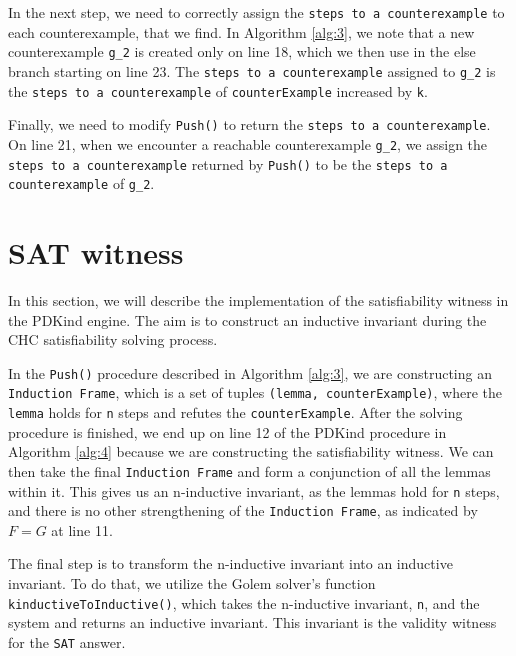 In the next step, we need to correctly assign the \texttt{steps to a
counterexample} to each counterexample, that we find. In Algorithm
\ref{alg:3}, we note that a new counterexample
\texttt{g\_2} is created only on line 18, which we then use in the else branch
starting on line 23. The \texttt{steps to a counterexample} assigned to
\texttt{g\_2} is the \texttt{steps to a counterexample} of
\texttt{counterExample} increased by \texttt{k}.

Finally, we need to modify \texttt{Push()} to return the \texttt{steps to a
counterexample}. On line 21, when we encounter a reachable counterexample
\texttt{g\_2}, we assign the \texttt{steps to a counterexample} returned by
\texttt{Push()} to be the \texttt{steps to a counterexample} of \texttt{g\_2}.

\section*{SAT witness}
\noindent In this section, we will describe the implementation of the
satisfiability witness in the PDKind engine. The aim is to construct an
inductive invariant during the CHC satisfiability solving process.

In the \texttt{Push()} procedure described in Algorithm
\ref{alg:3}, we are constructing an \texttt{Induction
Frame}, which is a set of tuples \texttt{(lemma, counterExample)}, where the
\texttt{lemma} holds for \texttt{n} steps and refutes the
\texttt{counterExample}. After the solving procedure is finished, we end up on
line 12 of the PDKind procedure in Algorithm \ref{alg:4}
because we are constructing the satisfiability
witness. We can then take the final \texttt{Induction Frame} and form a
conjunction of all the lemmas within it. This gives us an n-inductive
invariant, as the lemmas hold for \texttt{n} steps, and there is no other
strengthening of the \texttt{Induction Frame}, as indicated by \( F = G \) at
line 11.

The final step is to transform the n-inductive invariant into an inductive
invariant. To do that, we utilize the Golem solver's function
\texttt{kinductiveToInductive()}, which takes the n-inductive invariant,
\texttt{n}, and the system and returns an inductive invariant. This invariant
is the validity witness for the \texttt{SAT} answer.

